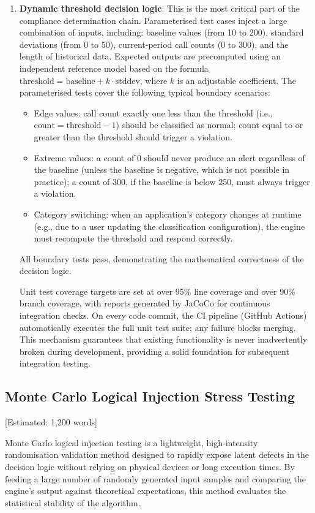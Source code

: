 \begin{enumerate}
\item \textbf{Dynamic threshold decision logic}: This is the most critical part of the compliance determination chain. Parameterised test cases inject a large combination of inputs, including: baseline values (from 10 to 200), standard deviations (from 0 to 50), current-period call counts (0 to 300), and the length of historical data. Expected outputs are precomputed using an independent reference model based on the formula $\text{threshold} = \text{baseline} + k \cdot \text{stddev}$, where $k$ is an adjustable coefficient. The parameterised tests cover the following typical boundary scenarios:
\begin{itemize}
    \item Edge values: call count exactly one less than the threshold (i.e., $\text{count} = \text{threshold} - 1$) should be classified as normal; count equal to or greater than the threshold should trigger a violation.
    \item Extreme values: a count of 0 should never produce an alert regardless of the baseline (unless the baseline is negative, which is not possible in practice); a count of 300, if the baseline is below 250, must always trigger a violation.
    \item Category switching: when an application's category changes at runtime (e.g., due to a user updating the classification configuration), the engine must recompute the threshold and respond correctly.
\end{itemize}

All boundary tests pass, demonstrating the mathematical correctness of the decision logic.

Unit test coverage targets are set at over 95\% line coverage and over 90\% branch coverage, with reports generated by JaCoCo for continuous integration checks. On every code commit, the CI pipeline (GitHub Actions) automatically executes the full unit test suite; any failure blocks merging. This mechanism guarantees that existing functionality is never inadvertently broken during development, providing a solid foundation for subsequent integration testing.
\end{enumerate}

\subsection{Monte Carlo Logical Injection Stress Testing} [Estimated: 1,200 words]

Monte Carlo logical injection testing is a lightweight, high-intensity randomisation validation method designed to rapidly expose latent defects in the decision logic without relying on physical devices or long execution times. By feeding a large number of randomly generated input samples and comparing the engine's output against theoretical expectations, this method evaluates the statistical stability of the algorithm.

